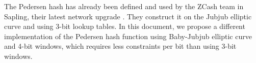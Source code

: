 
The Pedersen hash has already been defined and used by the ZCash team in Sapling,
their latest network upgrade \cite{sapling}.
They construct it on the Jubjub elliptic curve and using 3-bit lookup tables.
In this document, we propose a different implementation of the Pedersen hash function
using Baby-Jubjub elliptic curve and 4-bit windows, which requires less constraints per bit than using 3-bit windows.
